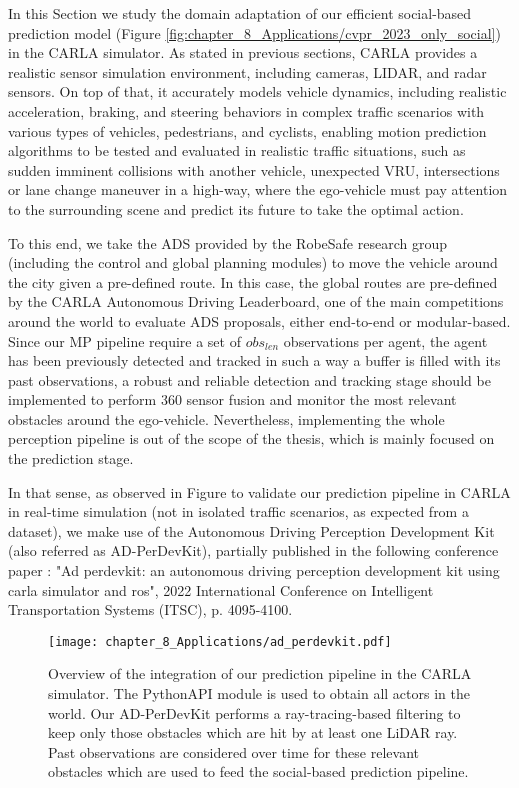 In this Section we study the domain adaptation of our efficient social-based prediction model (Figure \ref{fig:chapter_8_Applications/cvpr_2023_only_social}) in the CARLA simulator. As stated in previous sections, CARLA provides a realistic sensor simulation environment, including cameras, LIDAR, and radar sensors. On top of that, it accurately models vehicle dynamics, including realistic acceleration, braking, and steering behaviors in complex traffic scenarios with various types of vehicles, pedestrians, and cyclists, enabling motion prediction algorithms to be tested and evaluated in realistic traffic situations, such as sudden imminent collisions with another vehicle, unexpected \ac{VRU}, intersections or lane change maneuver in a high-way, where the ego-vehicle must pay attention to the surrounding scene and predict its future to take the optimal action. 

To this end, we take the \ac{ADS} provided by the RobeSafe research group (including the control and global planning modules) to move the vehicle around the city given a pre-defined route. In this case, the global routes are pre-defined by the CARLA Autonomous Driving Leaderboard, one of the main competitions around the world to evaluate \ac{ADS} proposals, either end-to-end or modular-based. Since our \ac{MP} pipeline require a set of \textit{$obs_{len}$} observations per agent, \ie the agent has been previously detected and tracked in such a way a buffer is filled with its past observations, a robust and reliable detection and tracking stage should be implemented to perform 360 \degree sensor fusion and monitor the most relevant obstacles around the ego-vehicle. Nevertheless, implementing the whole perception pipeline is out of the scope of the thesis, which is mainly focused on the prediction stage.

In that sense, as observed in Figure to validate our prediction pipeline in CARLA in real-time simulation (not in isolated traffic scenarios, as expected from a dataset), we make use of the Autonomous Driving Perception Development Kit (also referred as AD-PerDevKit), partially published in the following conference paper \cite{de2022ad}: "Ad perdevkit: an autonomous driving perception development kit using carla simulator and ros", 2022 International Conference on Intelligent Transportation Systems (ITSC), p. 4095-4100.  

\begin{figure}[h]
	\centering
	\texttt{[image: chapter\_8\_Applications/ad\_perdevkit.pdf]}
	\captionsetup{justification=justified}
	\caption{Overview of the integration of our prediction pipeline in the CARLA simulator. The PythonAPI module is used to obtain all actors in the world. Our AD-PerDevKit performs a ray-tracing-based filtering to keep only those obstacles which are hit by at least one LiDAR ray. Past observations are considered over time for these relevant obstacles which are used to feed the social-based prediction pipeline.}
	\label{fig:chapter_8_Applications/ad_perdevkit}
\end{figure}

